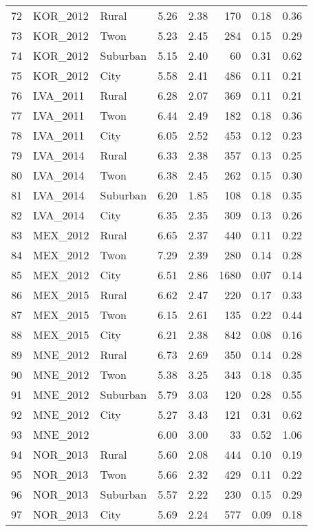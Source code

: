 \documentclass[12pt, titlepage]{article}
\begin{document}
\begin{table}[ht]
\begin{tabular}{rllrrrrr}
		72 & KOR\_2012 & Rural & 5.26 & 2.38 & 170 & 0.18 & 0.36 \\ 
		73 & KOR\_2012 & Twon & 5.23 & 2.45 & 284 & 0.15 & 0.29 \\ 
		74 & KOR\_2012 & Suburban & 5.15 & 2.40 &  60 & 0.31 & 0.62 \\ 
		75 & KOR\_2012 & City & 5.58 & 2.41 & 486 & 0.11 & 0.21 \\ 
		76 & LVA\_2011 & Rural & 6.28 & 2.07 & 369 & 0.11 & 0.21 \\ 
		77 & LVA\_2011 & Twon & 6.44 & 2.49 & 182 & 0.18 & 0.36 \\ 
		78 & LVA\_2011 & City & 6.05 & 2.52 & 453 & 0.12 & 0.23 \\ 
		79 & LVA\_2014 & Rural & 6.33 & 2.38 & 357 & 0.13 & 0.25 \\ 
		80 & LVA\_2014 & Twon & 6.38 & 2.45 & 262 & 0.15 & 0.30 \\ 
		81 & LVA\_2014 & Suburban & 6.20 & 1.85 & 108 & 0.18 & 0.35 \\ 
		82 & LVA\_2014 & City & 6.35 & 2.35 & 309 & 0.13 & 0.26 \\ 
		83 & MEX\_2012 & Rural & 6.65 & 2.37 & 440 & 0.11 & 0.22 \\ 
		84 & MEX\_2012 & Twon & 7.29 & 2.39 & 280 & 0.14 & 0.28 \\ 
		85 & MEX\_2012 & City & 6.51 & 2.86 & 1680 & 0.07 & 0.14 \\ 
		86 & MEX\_2015 & Rural & 6.62 & 2.47 & 220 & 0.17 & 0.33 \\ 
		87 & MEX\_2015 & Twon & 6.15 & 2.61 & 135 & 0.22 & 0.44 \\ 
		88 & MEX\_2015 & City & 6.21 & 2.38 & 842 & 0.08 & 0.16 \\ 
		89 & MNE\_2012 & Rural & 6.73 & 2.69 & 350 & 0.14 & 0.28 \\ 
		90 & MNE\_2012 & Twon & 5.38 & 3.25 & 343 & 0.18 & 0.35 \\ 
		91 & MNE\_2012 & Suburban & 5.79 & 3.03 & 120 & 0.28 & 0.55 \\ 
		92 & MNE\_2012 & City & 5.27 & 3.43 & 121 & 0.31 & 0.62 \\ 
		93 & MNE\_2012 &  & 6.00 & 3.00 &  33 & 0.52 & 1.06 \\ 
		94 & NOR\_2013 & Rural & 5.60 & 2.08 & 444 & 0.10 & 0.19 \\ 
		95 & NOR\_2013 & Twon & 5.66 & 2.32 & 429 & 0.11 & 0.22 \\ 
		96 & NOR\_2013 & Suburban & 5.57 & 2.22 & 230 & 0.15 & 0.29 \\ 
		97 & NOR\_2013 & City & 5.69 & 2.24 & 577 & 0.09 & 0.18 \\ 

\end{tabular}
\end{table}
\end{document}
